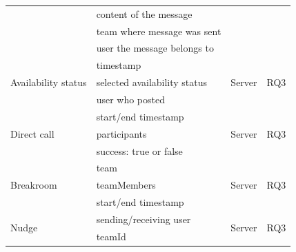\begin{table}[h]
\begin{tabularx}{.9\textwidth}{l X l l}
                                             & content of the message                 &                         &                               \\
                                             & team where message was sent            &                         &                               \\
                                             & user the message belongs to            &                         &                               \\
        \midrule
        \multirow{3}{*}{Availability status} & timestamp                              & \multirow{3}{*}{Server} & \multirow{3}{*}{RQ3}          \\
                                             & selected availability status           &                         &                               \\
                                             & user who posted                        &                         &                               \\
        \midrule
        \multirow{3}{*}{Direct call}         & start/end timestamp                    & \multirow{3}{*}{Server} & \multirow{3}{*}{RQ3}          \\
                                             & participants                           &                         &                               \\
                                             & success: true or false                 &                         &                               \\
        \midrule
        \multirow{3}{*}{Breakroom}           & team                                   & \multirow{3}{*}{Server} & \multirow{3}{*}{RQ3}          \\
                                             & teamMembers                            &                         &                               \\
                                             & start/end timestamp                    &                         &                               \\
        \midrule
        \multirow{4}{*}{Nudge}               & sending/receiving user                 & \multirow{4}{*}{Server} & \multirow{4}{*}{RQ3}          \\
                                             & teamId                                 &                         &                               \\

\end{tabularx}
\end{table}
